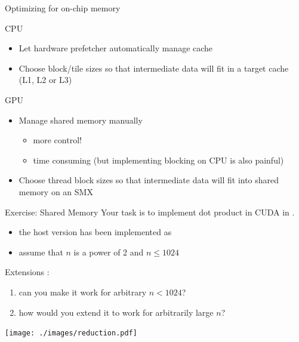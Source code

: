 \begin{frame}[fragile]{Optimizing for on-chip memory}
    \begin{info}{CPU}
        \begin{itemize}
            \item Let hardware prefetcher automatically manage cache
            \item Choose block/tile sizes so that intermediate data will fit in a target cache (L1, L2 or L3)
        \end{itemize}
    \end{info}
    \begin{info}{GPU}
        \begin{itemize}
            \item Manage shared memory manually
            \begin{itemize}
                \item more control!
                \item time consuming (but implementing blocking on CPU is also painful)
            \end{itemize}
            \item Choose thread block sizes so that intermediate data will fit into shared memory on an SMX
        \end{itemize}
    \end{info}

\end{frame}

\begin{frame}[fragile]{Exercise: Shared Memory}
    Your task is to implement dot product in CUDA in .
    \begin{itemize}
        \item the host version has been implemented as 
        \item assume that $n$ is a power of 2 and $n\leq1024$
    \end{itemize}

    Extensions :
    \begin{enumerate}
        \item can you make it work for arbitrary $n<1024$?
        \item how would you extend it to work for arbitrarily large $n$?
    \end{enumerate}

    \centering \texttt{[image: ./images/reduction.pdf]}

\end{frame}
